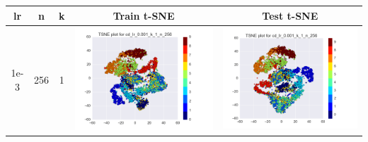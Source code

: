 \documentclass[12pt]{report}
\begin{document}
\begin{table}[H]
  \centering
  \begin{tabular}{ | c | c | c | c || c |}
    \hline
    \textbf{lr} & \textbf{n} & \textbf{k} & \textbf{Train t-SNE} & \textbf{Test t-SNE}  \\ \hline
    1e-3 & 256 & 1 &
    \begin{minipage}{.3\textwidth}
      \includegraphics[scale=0.25]{cd_lr_0_001_k_1_n_256.png}
    \end{minipage} &
    \begin{minipage}{.3\textwidth}
      \includegraphics[scale=0.25]{test_cd_lr_0_001_k_1_n_256.png}
    \end{minipage}
    \\ \hline

\end{tabular}
\end{table}
\end{document}
